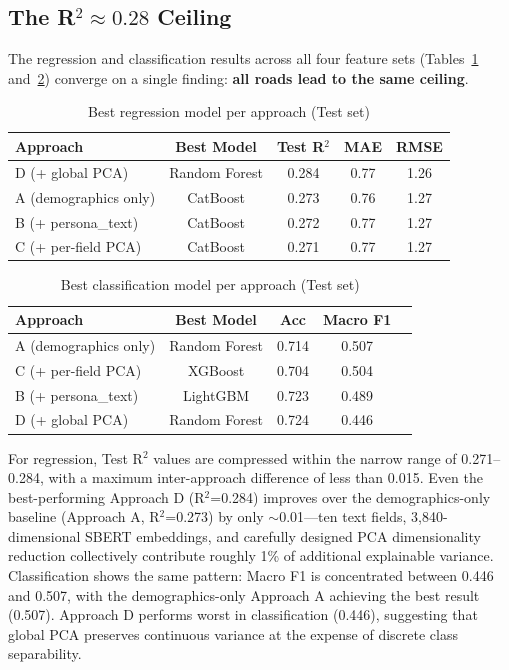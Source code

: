 \documentclass[11pt,a4paper]{article}
\begin{document}
\subsection{The R$^2 \approx 0.28$ Ceiling}

The regression and classification results across all four feature sets (Tables~\ref{tab:regression_best} and~\ref{tab:classification_best}) converge on a single finding: \textbf{all roads lead to the same ceiling}.

\begin{table}[H]
    \centering
    \caption{Best regression model per approach (Test set)}
    \label{tab:regression_best}
    \begin{tabular}{@{}lcccc@{}}
        \toprule
        \textbf{Approach} & \textbf{Best Model} & \textbf{Test R$^2$} & \textbf{MAE} & \textbf{RMSE} \\
        \midrule
        D (+ global PCA) & Random Forest & 0.284 & 0.77 & 1.26 \\
        A (demographics only) & CatBoost & 0.273 & 0.76 & 1.27 \\
        B (+ persona\_text) & CatBoost & 0.272 & 0.77 & 1.27 \\
        C (+ per-field PCA) & CatBoost & 0.271 & 0.77 & 1.27 \\
        \bottomrule
    \end{tabular}
\end{table}

\begin{table}[H]
    \centering
    \caption{Best classification model per approach (Test set)}
    \label{tab:classification_best}
    \begin{tabular}{@{}lcccc@{}}
        \toprule
        \textbf{Approach} & \textbf{Best Model} & \textbf{Acc} & \textbf{Macro F1} \\
        \midrule
        A (demographics only) & Random Forest & 0.714 & 0.507 \\
        C (+ per-field PCA) & XGBoost & 0.704 & 0.504 \\
        B (+ persona\_text) & LightGBM & 0.723 & 0.489 \\
        D (+ global PCA) & Random Forest & 0.724 & 0.446 \\
        \bottomrule
    \end{tabular}
\end{table}

For regression, Test R$^2$ values are compressed within the narrow range of 0.271--0.284, with a maximum inter-approach difference of less than 0.015. Even the best-performing Approach D (R$^2$=0.284) improves over the demographics-only baseline (Approach A, R$^2$=0.273) by only $\sim$0.01---ten text fields, 3,840-dimensional SBERT embeddings, and carefully designed PCA dimensionality reduction collectively contribute roughly 1\% of additional explainable variance. Classification shows the same pattern: Macro F1 is concentrated between 0.446 and 0.507, with the demographics-only Approach A achieving the best result (0.507). Approach D performs worst in classification (0.446), suggesting that global PCA preserves continuous variance at the expense of discrete class separability.
\end{document}
